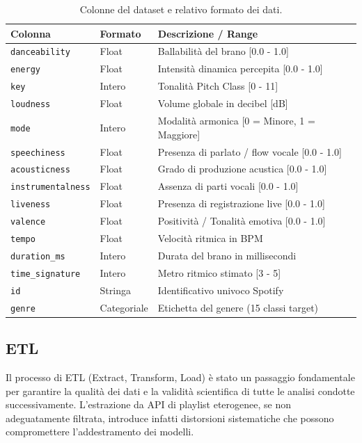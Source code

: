 \begin{table}[H]
\centering
\caption{Colonne del dataset e relativo formato dei dati.}
\label{tab:colonne_dataset}
\vspace{0.2cm}
\begin{tabular}{lll}
\toprule
\textbf{Colonna} & \textbf{Formato} & \textbf{Descrizione / Range} \\
\midrule
\texttt{danceability} & Float & Ballabilità del brano [0.0 - 1.0] \\
\texttt{energy} & Float & Intensità dinamica percepita [0.0 - 1.0] \\
\texttt{key} & Intero & Tonalità Pitch Class [0 - 11] \\
\texttt{loudness} & Float & Volume globale in decibel [dB] \\
\texttt{mode} & Intero & Modalità armonica [0 = Minore, 1 = Maggiore] \\
\texttt{speechiness} & Float & Presenza di parlato / flow vocale [0.0 - 1.0] \\
\texttt{acousticness} & Float & Grado di produzione acustica [0.0 - 1.0] \\
\texttt{instrumentalness} & Float & Assenza di parti vocali [0.0 - 1.0] \\
\texttt{liveness} & Float & Presenza di registrazione live [0.0 - 1.0] \\
\texttt{valence} & Float & Positività / Tonalità emotiva [0.0 - 1.0] \\
\texttt{tempo} & Float & Velocità ritmica in BPM \\
\texttt{duration\_ms} & Intero & Durata del brano in millisecondi \\
\texttt{time\_signature} & Intero & Metro ritmico stimato [3 - 5] \\
\texttt{id} & Stringa & Identificativo univoco Spotify \\
\texttt{genre} & Categoriale & Etichetta del genere (15 classi target) \\
\bottomrule
\end{tabular}
\end{table}

\newpage
\subsection{ETL}

Il processo di ETL (Extract, Transform, Load) è stato un passaggio fondamentale per garantire la qualità dei dati e la validità scientifica di tutte le analisi condotte successivamente. L'estrazione da API di playlist eterogenee, se non adeguatamente filtrata, introduce infatti distorsioni sistematiche che possono compromettere l'addestramento dei modelli.

